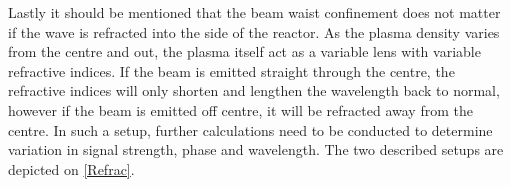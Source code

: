 Lastly it should be mentioned that the beam waist confinement does not matter if the wave is refracted into the side of the reactor. As the plasma density varies from the centre and out, the plasma itself act as a variable lens with variable refractive indices. If the beam is emitted straight through the centre, the refractive indices will only shorten and lengthen the wavelength back to normal, however if the beam is emitted off centre, it will be refracted away from the centre. In such a setup, further calculations need to be conducted to determine variation in signal strength, phase and wavelength. The two described setups are depicted on \cref{Refrac}.
